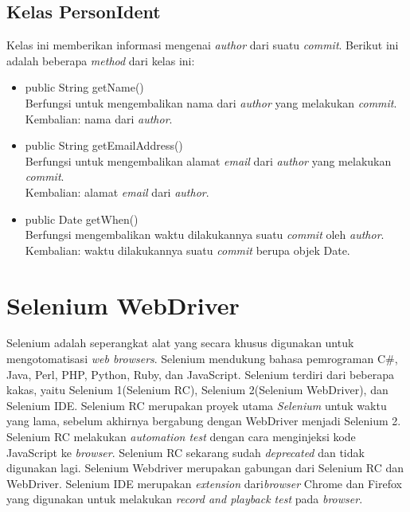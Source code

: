 \subsection{Kelas PersonIdent}
\label{subsec:personident}
Kelas ini memberikan informasi mengenai \textit{author} dari suatu \textit{commit}. Berikut ini adalah beberapa \textit{method} dari kelas ini:
\begin{itemize}
\item public String getName()\\
Berfungsi untuk mengembalikan nama dari \textit{author} yang melakukan \textit{commit}.\\
Kembalian: nama dari \textit{author}.

\item public String getEmailAddress()\\
Berfungsi untuk mengembalikan alamat \textit{email} dari \textit{author} yang melakukan \textit{commit}.\\
Kembalian: alamat \textit{email} dari \textit{author}.

\item public Date getWhen()\\
Berfungsi mengembalikan waktu dilakukannya suatu \textit{commit} oleh \textit{author}.\\
Kembalian: waktu dilakukannya suatu \textit{commit} berupa objek Date.
\end{itemize}

\section{Selenium WebDriver}
\label{sec:selenium_webdriver}
Selenium adalah seperangkat alat yang secara khusus digunakan untuk mengotomatisasi \textit{web browsers}\cite{Selenium}. Selenium mendukung bahasa pemrograman C\#, Java, Perl, PHP, Python, Ruby, dan JavaScript. Selenium terdiri dari beberapa kakas, yaitu Selenium 1(Selenium RC), Selenium 2(Selenium WebDriver), dan Selenium IDE. Selenium RC merupakan proyek utama \textit{Selenium} untuk waktu yang lama, sebelum akhirnya bergabung dengan WebDriver menjadi Selenium 2. Selenium RC melakukan \textit{automation test} dengan cara menginjeksi kode JavaScript ke \textit{browser}. Selenium RC sekarang sudah \textit{deprecated} dan tidak digunakan lagi. Selenium Webdriver merupakan gabungan dari Selenium RC dan WebDriver. Selenium IDE merupakan \textit{extension} dari\textit{browser} Chrome dan Firefox yang digunakan untuk melakukan \textit{record and playback test} pada \textit{browser}. 
 
